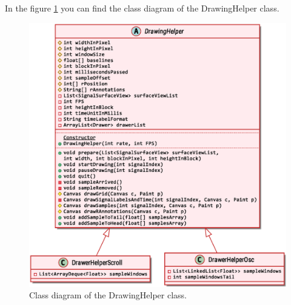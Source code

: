 In the figure \ref{fig9.10} you can find the class diagram of the DrawingHelper class.
\begin{figure}[ht!]
	\centering
	\includegraphics[width=140mm]{figures/ch9/10.eps}
	\caption{Class diagram of the DrawingHelper class.}
	\label{fig9.10}
\end{figure}

